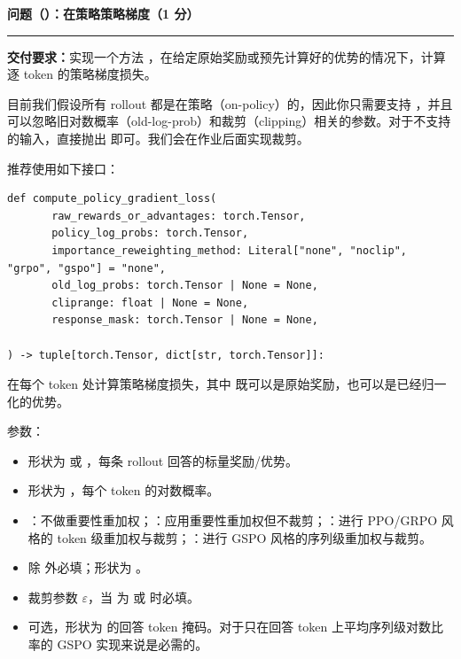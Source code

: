 \medskip
\noindent\textbf{问题（）：在策略策略梯度（1 分）}
\par\nobreak\smallskip\hrule\nobreak\medskip

\textbf{交付要求：}实现一个方法 ，在给定原始奖励或预先计算好的优势的情况下，计算逐 token 的策略梯度损失。

目前我们假设所有 rollout 都是在策略（on-policy）的，因此你只需要支持 ，并且可以忽略旧对数概率（old-log-prob）和裁剪（clipping）相关的参数。对于不支持的输入，直接抛出  即可。我们会在作业后面实现裁剪。

推荐使用如下接口：

\begin{lstlisting}
def compute_policy_gradient_loss(
       raw_rewards_or_advantages: torch.Tensor,
       policy_log_probs: torch.Tensor,
       importance_reweighting_method: Literal["none", "noclip", "grpo", "gspo"] = "none",
       old_log_probs: torch.Tensor | None = None,
       cliprange: float | None = None,
       response_mask: torch.Tensor | None = None,

) -> tuple[torch.Tensor, dict[str, torch.Tensor]]:
\end{lstlisting}

在每个 token 处计算策略梯度损失，其中  既可以是原始奖励，也可以是已经归一化的优势。

参数：

\begin{itemize}
  \item {} 形状为  或 ，每条 rollout 回答的标量奖励/优势。
  \item {} 形状为 ，每个 token 的对数概率。
  \item {} ：不做重要性重加权；：应用重要性重加权但不裁剪；：进行 PPO/GRPO 风格的 token 级重加权与裁剪；：进行 GSPO 风格的序列级重加权与裁剪。
  \item {} 除  外必填；形状为 。
  \item {} 裁剪参数 $\varepsilon$，当  为  或  时必填。
  \item {} 可选，形状为  的回答 token 掩码。对于只在回答 token 上平均序列级对数比率的 GSPO 实现来说是必需的。
\end{itemize}

